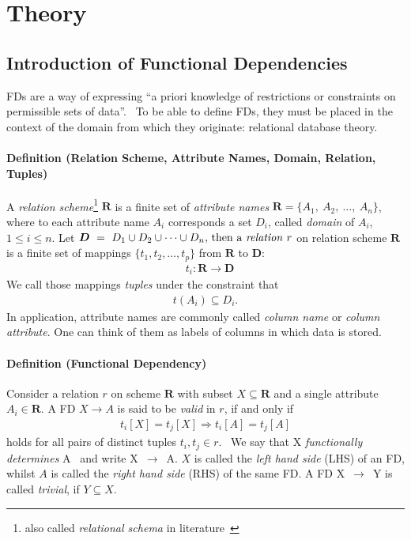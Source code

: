 \newpage
\section{Theory}
\subsection{Introduction of Functional Dependencies}
FDs are a way of expressing ``a priori knowledge of restrictions or constraints on permissible sets of data''.~\cite[p.~42]{MAI83}
To be able to define FDs, they must be placed in the context of the domain from which they originate: relational database theory.

\paragraph{Definition (Relation Scheme, Attribute Names, Domain, Relation, Tuples)} A \emph{relation scheme}\footnote{also called \emph{relational schema} in literature~\cite[p.~21]{ABE19} } \(\boldsymbol{R}\) is a finite set of \emph{attribute names} \( \boldsymbol{R} = \{A_1,~A_2,~\dots,~A_n\}\), where to each attribute name \(A_i\) corresponds a set \(D_i\), called \emph{domain} of \(A_i\), \(1 \leq i \leq n\).
Let \(\boldsymbol{D}~=~D_1 \cup D_2 \cup \dots \cup D_n$, then a \emph{relation} \(r\) on relation scheme \(\boldsymbol{R}\) is a finite set of mappings \(\{t_1, t_2, \dots, t_p\}\) from \(\boldsymbol{R}\) to \(\boldsymbol{D}\):
\begin{align*}
  &t_i: \boldsymbol{R} \to \boldsymbol{D}
\end{align*}
We call those mappings \emph{tuples} under the constraint that~\cite[p.2]{MAI83}
\begin{align*}
    t(A_i) \subseteq D_i.
\end{align*}
In application, attribute names are commonly called \emph{column name} or \emph{column attribute}.
One can think of them as labels of columns in which data is stored.

\paragraph{Definition (Functional Dependency)}
Consider a relation \(r\) on scheme \(\boldsymbol{R}\) with subset \(X \subseteq \boldsymbol{R}\) and a single attribute \(A_i \in \boldsymbol{R}\).
A FD \(X \to A\) is said to be \emph{valid} in \(r\), if and only if
\begin{align}
    t_i[X] = t_j[X] \Rightarrow t_i[A] = t_j[A] \label{eq:fd-condition}
\end{align}
holds for all pairs of distinct tuples \(t_i,t_j \in r\).~\cite[p.~21]{ABE19}
We say that \textsc{X} \emph{functionally determines} \textsc{A}~\cite[p.~43]{MAI83} and write \textsc{X}~\( \rightarrow \)~\textsc{A}.
\(X\) is called the \emph{left hand side} (LHS) of an FD, whilst \(A\) is called the \emph{right hand side} (RHS) of the same FD.
A FD \textsc{X}~\( \rightarrow \)~\textsc{Y} is called \emph{trivial}, if \( Y \subseteq X \).~\cite[p.~163]{STU16}

